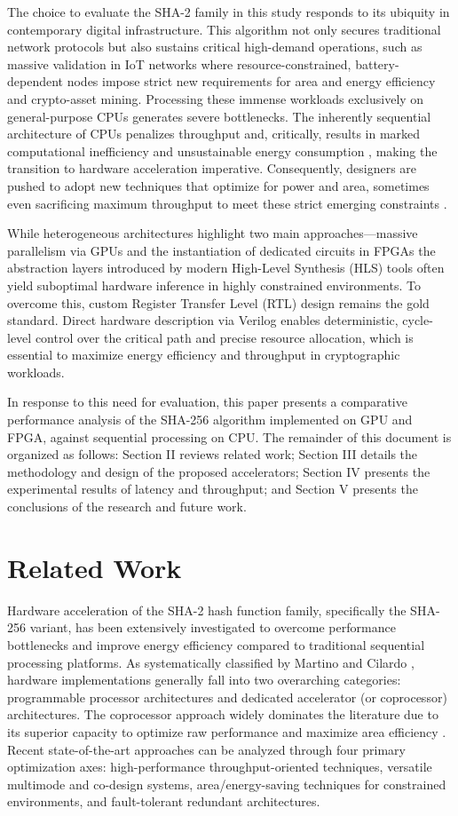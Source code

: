 \documentclass[conference]{IEEEtran}
\begin{document}
The choice to evaluate the SHA-2 family in this study responds to its ubiquity in contemporary digital infrastructure. This algorithm not only secures traditional network protocols but also sustains critical high-demand operations, such as massive validation in IoT networks where resource-constrained, battery-dependent nodes impose strict new requirements for area and energy efficiency \cite{martino2020} and crypto-asset mining. Processing these immense workloads exclusively on general-purpose CPUs generates severe bottlenecks. The inherently sequential architecture of CPUs penalizes throughput and, critically, results in marked computational inefficiency and unsustainable energy consumption \cite{r1}, making the transition to hardware acceleration imperative. Consequently, designers are pushed to adopt new techniques that optimize for power and area, sometimes even sacrificing maximum throughput to meet these strict emerging constraints \cite{martino2020}.

While heterogeneous architectures highlight two main approaches—massive parallelism via GPUs and the instantiation of dedicated circuits in FPGAs the abstraction layers introduced by modern High-Level Synthesis (HLS) tools often yield suboptimal hardware inference in highly constrained environments. To overcome this, custom Register Transfer Level (RTL) design remains the gold standard. Direct hardware description via Verilog enables deterministic, cycle-level control over the critical path and precise resource allocation, which is essential to maximize energy efficiency and throughput in cryptographic workloads.

In response to this need for evaluation, this paper presents a comparative performance analysis of the SHA-256 algorithm implemented on GPU and FPGA, against sequential processing on CPU. The remainder of this document is organized as follows: Section II reviews related work; Section III details the methodology and design of the proposed accelerators; Section IV presents the experimental results of latency and throughput; and Section V presents the conclusions of the research and future work.

\section{Related Work}
Hardware acceleration of the SHA-2 hash function family, specifically the SHA-256 variant, has been extensively investigated to overcome performance bottlenecks and improve energy efficiency compared to traditional sequential processing platforms. As systematically classified by Martino and Cilardo \cite{martino2020}, hardware implementations generally fall into two overarching categories: programmable processor architectures and dedicated accelerator (or coprocessor) architectures. 
The coprocessor approach widely dominates the literature due to its superior capacity to optimize raw performance and maximize area efficiency \cite{martino2020}. 
Recent state-of-the-art approaches can be analyzed through four primary optimization axes: high-performance throughput-oriented techniques, versatile multimode and co-design systems, area/energy-saving techniques for constrained environments, and fault-tolerant redundant architectures.
\end{document}

